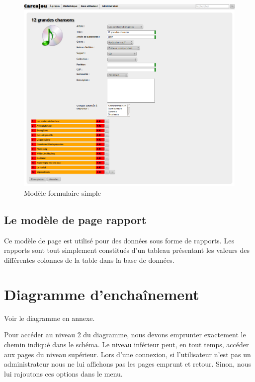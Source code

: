 \documentclass[letter, 11pt]{report}
\begin{document}
\begin{figure}[htbp]
	\begin{center}
		\includegraphics[scale=0.4]{captures_ecran/modele_details_medias.png}
	\end{center}
	\caption{Modèle formulaire simple}
\end{figure}

\subsection{Le modèle de page rapport}

Ce modèle de page est utilisé pour des données sous forme de rapports. Les rapports sont tout simplement constitués d'un tableau présentant les valeurs des différentes colonnes de la table dans la base de données.

\section{Diagramme d'enchaînement}

Voir le diagramme en annexe.

Pour accéder au niveau 2 du diagramme, nous devons emprunter exactement le chemin indiqué dans le schéma. Le niveau inférieur peut, en tout temps, accéder aux pages du niveau supérieur. Lors d'une connexion, si l'utilisateur n'est pas un administrateur nous ne lui affichons pas les pages emprunt et retour. Sinon, nous lui rajoutons ces options dans le menu.
\end{document}
